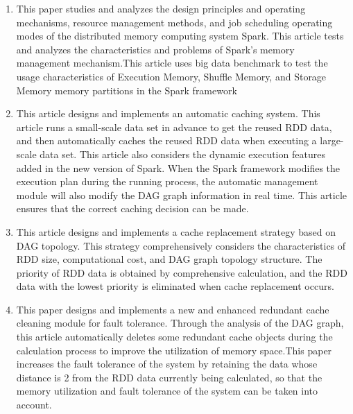 \begin{enumerate}
    \item This paper studies and analyzes the design principles and operating mechanisms, resource management methods, and job scheduling operating modes of the distributed memory computing system Spark. This article tests and analyzes the characteristics and problems of Spark's memory management mechanism.This article uses big data benchmark to test the usage characteristics of Execution Memory, Shuffle Memory, and Storage Memory memory partitions in the Spark framework
    \item This article designs and implements an automatic caching system. This article runs a small-scale data set in advance to get the reused RDD data, and then automatically caches the reused RDD data when executing a large-scale data set. This article also considers the dynamic execution features added in the new version of Spark. When the Spark framework modifies the execution plan during the running process, the automatic management module will also modify the DAG graph information in real time. This article ensures that the correct caching decision can be made.
    \item This article designs and implements a cache replacement strategy based on DAG topology. This strategy comprehensively considers the characteristics of RDD size, computational cost, and DAG graph topology structure. The priority of RDD data is obtained by comprehensive calculation, and the RDD data with the lowest priority is eliminated when cache replacement occurs.
    \item This paper designs and implements a new and enhanced redundant cache cleaning module for fault tolerance. Through the analysis of the DAG graph, this article automatically deletes some redundant cache objects during the calculation process to improve the utilization of memory space.This paper increases the fault tolerance of the system by retaining the data whose distance is 2 from the RDD data currently being calculated, so that the memory utilization and fault tolerance of the system can be taken into account.
\end{enumerate}


